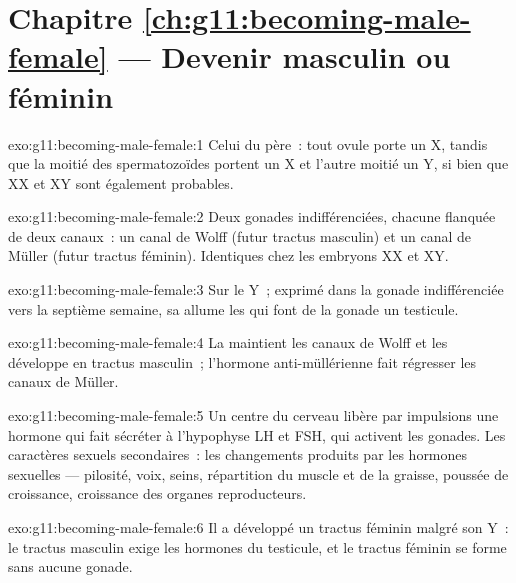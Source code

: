\section*{Chapitre \ref{ch:g11:becoming-male-female} --- Devenir masculin ou féminin}

\begin{solution}{exo:g11:becoming-male-female:1}
Celui du père~: tout ovule porte un X, tandis que la moitié des
spermatozoïdes portent un X et l'autre moitié un Y, si bien que XX et
XY sont également probables.
\end{solution}

\begin{solution}{exo:g11:becoming-male-female:2}
Deux gonades indifférenciées, chacune flanquée de deux canaux~: un
canal de Wolff (futur tractus masculin) et un canal de Müller (futur
tractus féminin). Identiques chez les embryons XX et XY.
\end{solution}

\begin{solution}{exo:g11:becoming-male-female:3}
Sur le  Y~; exprimé dans la gonade indifférenciée vers la
septième semaine, sa  allume les  qui font de la gonade un
testicule.
\end{solution}

\begin{solution}{exo:g11:becoming-male-female:4}
La  maintient les canaux de Wolff et les développe en
tractus masculin~; l'hormone anti-müllérienne fait régresser les canaux
de Müller.
\end{solution}

\begin{solution}{exo:g11:becoming-male-female:5}
Un centre du cerveau libère par impulsions une hormone qui fait
sécréter à l'hypophyse LH et FSH, qui activent les gonades. Les
caractères sexuels secondaires~: les changements produits par les
hormones sexuelles --- pilosité, voix, seins, répartition du muscle et
de la graisse, poussée de croissance, croissance des organes
reproducteurs.
\end{solution}

\begin{solution}{exo:g11:becoming-male-female:6}
Il a développé un tractus féminin malgré son  Y~: le tractus
masculin exige les hormones du testicule, et le tractus féminin se
forme sans aucune gonade.
\end{solution}

